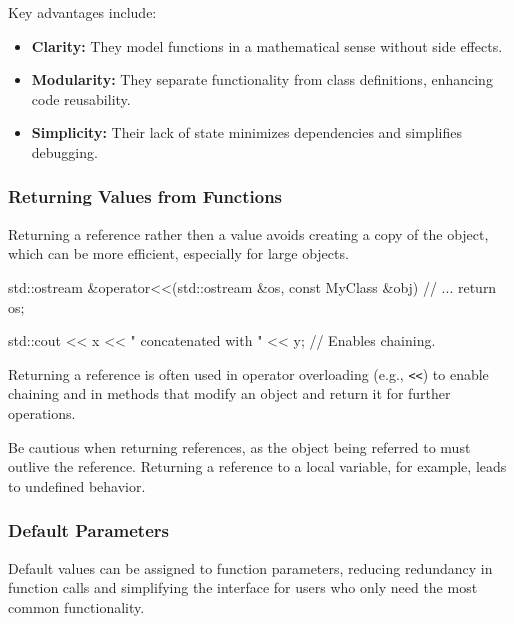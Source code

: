Key advantages include:
\begin{itemize}
    \item \textbf{Clarity:} They model functions in a mathematical sense without side effects.
    \item \textbf{Modularity:} They separate functionality from class definitions, enhancing code reusability.
    \item \textbf{Simplicity:} Their lack of state minimizes dependencies and simplifies debugging.
\end{itemize}

\subsubsection{Returning Values from Functions}

\vspace{-0.5em}

Returning a reference rather then a value avoids creating a copy of the object, which can be more efficient, especially for large objects.

\vspace{-0.5em}

\begin{codeblock}[language=C++, numbers=none]
std::ostream &operator<<(std::ostream &os, const MyClass &obj) {
    // ...
    return os;
}

std::cout << x << " concatenated with " << y; // Enables chaining.
\end{codeblock}

\vspace{-0.5em}

Returning a reference is often used in operator overloading (e.g., \texttt{<<}) to enable chaining and in methods that modify an object and return it for further operations.

\begin{warningblock}
    Be cautious when returning references, as the object being referred to must outlive the reference.  Returning a reference to a local variable, for example, leads to undefined behavior.
\end{warningblock}

\subsubsection{Default Parameters}

Default values can be assigned to function parameters, reducing redundancy in function calls and simplifying the interface for users who only need the most common functionality.

